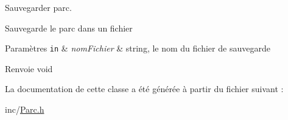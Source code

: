 Sauvegarder parc. 

Sauvegarde le parc dans un fichier


\begin{DoxyParams}[1]{Paramètres}
\mbox{\tt in}  & {\em nomFichier} & string, le nom du fichier de sauvegarde \\
\hline
\end{DoxyParams}
\begin{DoxyReturn}{Renvoie}
void 
\end{DoxyReturn}


La documentation de cette classe a été générée à partir du fichier suivant :\begin{DoxyCompactItemize}
\item 
inc/\hyperlink{_parc_8h}{Parc.h}\end{DoxyCompactItemize}

